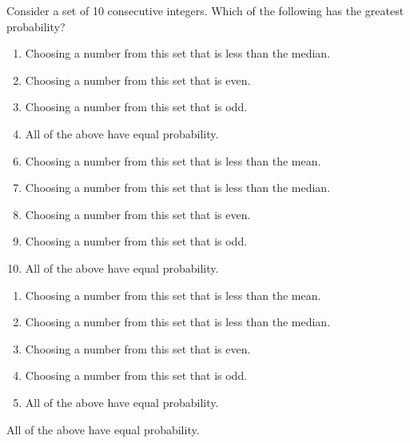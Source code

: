 


  Consider a set of 10 consecutive integers.  Which of the following has the greatest probability?


\ifsat
	\begin{enumerate}[label=\Alph*)]
		\item  Choosing a number from this set that is less than the median.
		\item  Choosing a number from this set that is even.
		\item  Choosing a number from this set that is odd.
		\item  All of the above have equal probability.%
	\end{enumerate}
\else
\fi

\ifacteven
	\begin{enumerate}[label=\textbf{\Alph*.},itemsep=\fill,align=left]
		\setcounter{enumii}{5}
		\item   Choosing a number from this set that is less than the mean.
		\item  Choosing a number from this set that is less than the median.
		\item  Choosing a number from this set that is even.
		\addtocounter{enumii}{1}
		\item  Choosing a number from this set that is odd.
		\item  All of the above have equal probability.%
	\end{enumerate}
\else
\fi

\ifactodd
	\begin{enumerate}[label=\textbf{\Alph*.},itemsep=\fill,align=left]
		\item   Choosing a number from this set that is less than the mean.
		\item  Choosing a number from this set that is less than the median.
		\item  Choosing a number from this set that is even.
		\item  Choosing a number from this set that is odd.
		\item  All of the above have equal probability.%
	\end{enumerate}
\else
\fi

\ifgridin
  All of the above have equal probability.%

\else
\fi

